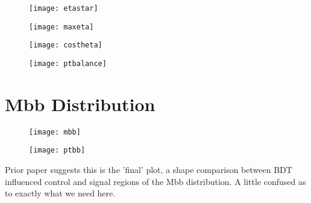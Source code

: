 		\begin{figure}[h]
			\centering
			\begin{minipage}[h]{0.45\linewidth}
				\texttt{[image: etastar]}
				\caption{}
				\label{fig:bdtetastar}
			\end{minipage}
			\quad
			\begin{minipage}[h]{0.45\linewidth}
				\texttt{[image: maxeta]}
				\caption{}
				\label{fig:bdtmaxeta}
			\end{minipage}
		\end{figure}
		
		\begin{figure}[h]
			\centering
			\begin{minipage}[h]{0.45\linewidth}
				\texttt{[image: costheta]}
				\caption{}
				\label{fig:bdtcpostheta}
			\end{minipage}
			\quad
			\begin{minipage}[h]{0.45\linewidth}
				\texttt{[image: ptbalance]}
				\caption{}
				\label{fig:bdtptbalance}
			\end{minipage}
		\end{figure}


\section{Mbb Distribution}

		\begin{figure}[h]
			\centering
			\begin{minipage}[h]{0.45\linewidth}
				\texttt{[image: mbb]}
				\caption{}
				\label{fig:bdtmbb}
			\end{minipage}
			\quad
			\begin{minipage}[h]{0.45\linewidth}
				\texttt{[image: ptbb]}
				\caption{}
				\label{fig:bdtptbb}
			\end{minipage}
		\end{figure}

	Prior paper suggests this is the 'final' plot, a shape comparison between BDT influenced control and signal regions of the Mbb distribution. A little confused as to exactly what we need here.

\endinput
